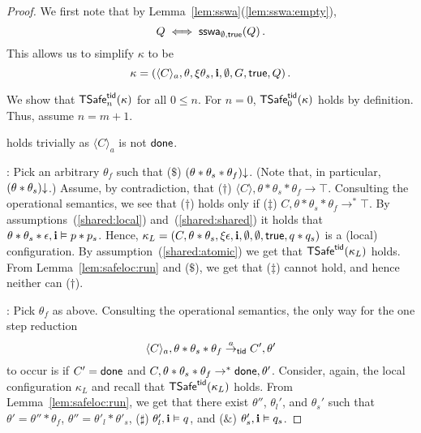 \begin{proof}
We first note that by Lemma~\ref{lem:sswa}(\ref{lem:sswa:empty}), 
$$
Q \iff \mathsf{sswa}_{\emptyset,\mathsf{true}}(Q)\,.
$$
This allows us to simplify $\kappa$ to be
$$
\kappa=(\langle C \rangle_a,\theta,\xi\theta_s,{\bf i},\emptyset,G,\mathsf{true}, Q)\,.
$$

We show that ${\sf TSafe}^{{\sf tid}}_n(\kappa)$ for all $0 \leq n$.
For $n = 0$, ${\sf TSafe}^{{\sf tid}}_0(\kappa)$  holds by definition.
Thus, assume $n= m+1$.

 holds trivially as $\langle C \rangle_a$ is not ${\sf done}$. 

: 
Pick an arbitrary $\theta_f$ such that ($\$$)
$(\theta * \theta_s * \theta_f)\mathpunct{\downarrow}$.
(Note that, in particular, $(\theta * \theta_s)\mathpunct{\downarrow}$.)
Assume, by contradiction, that ($\dagger$) $\langle C \rangle, \theta * \theta_s * \theta_f \rightarrow \top$.
Consulting the operational semantics, we see that ($\dagger$) holds only if 
($\ddag$) $C, \theta  * \theta_s * \theta_f \rightarrow^* \top$.
By assumptions~(\ref{shared:local}) and~(\ref{shared:shared})
it holds that $\theta * \theta_s *\epsilon,{\bf i}\vDash p * p_s$.
Hence,
$\kappa_L =  (C,\theta * \theta_s,\xi\epsilon,{\bf i},\emptyset,\emptyset,\mathsf{true},q * q_s)$
is a  (local) configuration.
By assumption~(\ref{shared:atomic}) we get that ${\sf TSafe}^{{\sf tid}}(\kappa_L)$ holds.
From Lemma~\ref{lem:safeloc:run} and ($\$$), we get that ($\ddag$) cannot hold, 
and hence neither can ($\dagger$).

: 
Pick  $\theta_f$ as above.
Consulting the operational semantics,
the only way for the one step reduction 
$$
\langle C \rangle_a, \theta * \theta_s * \theta_f \stackrel{a}{\rightarrow}_{{\sf tid}} C',\theta'
$$ 
to occur is if $C'={\sf done}$ and $C, \theta * \theta_s * \theta_f \rightarrow^* {\sf done},\theta'$.
Consider, again, the local configuration $\kappa_L$ and recall that 
${\sf TSafe}^{{\sf tid}}(\kappa_L)$ holds.
From Lemma~\ref{lem:safeloc:run}, we get that there exist 
$\theta''$, $\theta_l'$, and $\theta_s'$ such that $\theta' = \theta'' * \theta_f$,  
$\theta'' = \theta'_l * \theta'_s$, 
($\sharp$) $\theta'_l,{\bf i} \vDash q$, and 
($\&$) $\theta'_s, {\bf i} \vDash q_s$.


\end{proof}

